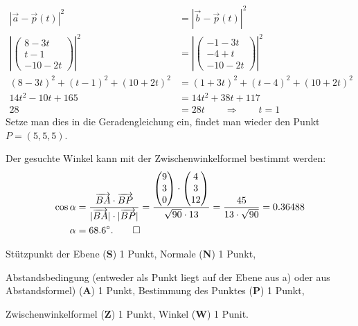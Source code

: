 \begin{loesung}
\begin{teilaufgaben}
\begin{align*}
|\vec{a} - \vec{p}(t)|^2&=|\vec{b}-\vec{p}(t)|^2
\\
\left|
\begin{pmatrix}
8-3t\\t-1\\-10-2t
\end{pmatrix}
\right|^2
&=
\left|
\begin{pmatrix}
-1-3t\\-4+t\\-10-2t
\end{pmatrix}
\right|^2
\\
(8-3t)^2+(t-1)^2+(10+2t)^2
&=
(1+3t)^2 + (t-4)^2+(10+2t)^2
\\
14t^2-10t+165
&=
14t^2+38t+117
\\
28
&=
28t
\qquad\Rightarrow\qquad
t=1
\end{align*}
Setze man dies in die Geradengleichung ein, findet man wieder den Punkt
$P=(5,5,5)$.
\item
Der gesuchte Winkel kann mit der Zwischenwinkelformel bestimmt werden:
\begin{align*}
\cos\alpha
&=
\frac{
\overrightarrow{BA}\cdot \overrightarrow{BP}
}{
|\overrightarrow{BA}|\cdot |\overrightarrow{BP}|
}
=
\frac{
\begin{pmatrix}9\\3\\0\end{pmatrix}
\cdot
\begin{pmatrix}4\\3\\12\end{pmatrix}
}{
\sqrt{90}\cdot 13
}
=
\frac{45}{13\cdot\sqrt{90}}
=
0.36488
\\
\alpha
&=
68.6^\circ.
\qedhere
\end{align*}
\end{teilaufgaben}
\end{loesung}

\begin{bewertung}
\begin{teilaufgaben}
\item
Stützpunkt der Ebene ({\bf S}) 1 Punkt,
Normale ({\bf N}) 1 Punkt,
\item
Abstandsbedingung (entweder als Punkt liegt auf der Ebene aus a) oder
aus Abstandsformel) ({\bf A}) 1 Punkt,
Bestimmung des Punktes ({\bf P}) 1 Punkt,
\item
Zwischenwinkelformel ({\bf Z}) 1 Punkt,
Winkel ({\bf W}) 1 Punit.
\end{teilaufgaben}
\end{bewertung}





